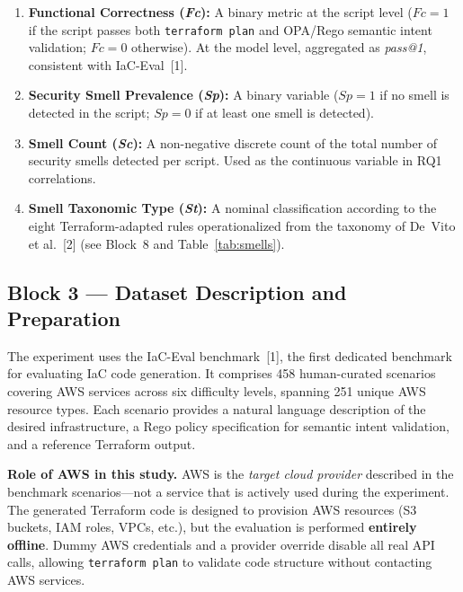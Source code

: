 \begin{enumerate}
    \item \textbf{Functional Correctness (\textit{Fc}):} A binary
          metric at the script level ($Fc = 1$ if the script passes
          both \texttt{terraform plan} and OPA/Rego semantic intent
          validation; $Fc = 0$ otherwise). At the model level,
          aggregated as \textit{pass@1}, consistent with
          IaC-Eval~[1].
    \item \textbf{Security Smell Prevalence (\textit{Sp}):} A binary
          variable ($Sp = 1$ if no smell is detected in the script;
          $Sp = 0$ if at least one smell is detected).
    \item \textbf{Smell Count (\textit{Sc}):} A non-negative discrete
          count of the total number of security smells detected per
          script. Used as the continuous variable in RQ1 correlations.
    \item \textbf{Smell Taxonomic Type (\textit{St}):} A nominal
          classification according to the eight Terraform-adapted
          rules operationalized from the taxonomy of
          De~Vito et al.~[2] (see Block~8 and
          Table~\ref{tab:smells}).
\end{enumerate}

\subsection{Block 3 --- Dataset Description and Preparation}
\label{sec:block3}

The experiment uses the IaC-Eval benchmark~[1], the first dedicated
benchmark for evaluating IaC code generation. It comprises 458
human-curated scenarios covering AWS services across six difficulty
levels, spanning 251 unique AWS resource types. Each scenario provides
a natural language description of the desired infrastructure, a Rego
policy specification for semantic intent validation, and a reference
Terraform output.

\textbf{Role of AWS in this study.} AWS is the \textit{target cloud
provider} described in the benchmark scenarios---not a service that
is actively used during the experiment. The generated Terraform code
is designed to provision AWS resources (S3 buckets, IAM roles, VPCs,
etc.), but the evaluation is performed \textbf{entirely offline}.
Dummy AWS credentials and a provider override disable all real API
calls, allowing \texttt{terraform plan} to validate code structure
without contacting AWS services.

